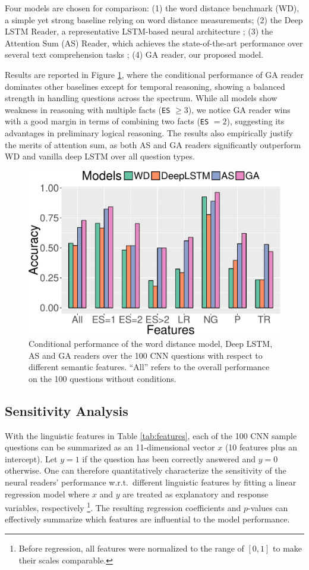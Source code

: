 \documentclass[11pt,a4paper]{article}
\begin{document}
Four models are chosen for comparison: (1) the word distance benchmark (WD), a simple yet strong baseline relying on word distance measurements; (2) the Deep LSTM Reader, a representative LSTM-based neural architecture
\citep{hermann2015teaching}; (3) the Attention Sum (AS) Reader, which achieves the state-of-the-art performance over several text comprehension tasks \citep{kadlec2016text}; (4) GA reader, our proposed model.

Results are reported in Figure \ref{fig:cond-performance},
where the conditional performance of GA reader dominates other baselines except for temporal reasoning, showing a balanced strength in handling questions across the spectrum. While all models show weakness in reasoning with multiple facts (\texttt{ES} $\ge 3$), we notice GA reader wins with a good margin in terms of combining two facts (\texttt{ES} $=2$), suggesting its advantages in preliminary logical reasoning. The results also empirically justify the merits of attention sum, as both AS and GA readers significantly outperform WD and vanilla deep LSTM over all question types.

\begin{figure}[t]
\centering
\includegraphics[width=0.9\linewidth]{cond-performance.pdf}
\caption{Conditional performance of the word distance model, Deep LSTM, AS and GA readers over the 100 CNN questions with respect to different semantic features. ``All'' refers to the overall performance on the 100 questions without conditions.}
\label{fig:cond-performance}
\end{figure}

\subsection{Sensitivity Analysis}
With the linguistic features in Table \ref{tab:features}, each of the 100 CNN sample questions can be summarized as an 11-dimensional vector $x$ (10 features plus an intercept). Let $y = 1$ if the question has been correctly answered and $y=0$ otherwise. One can therefore quantitatively characterize the sensitivity of the neural readers' performance w.r.t.\ different linguistic features by fitting a linear regression model where $x$ and $y$ are treated as explanatory and response variables, respectively
\footnote{Before regression, all features were normalized to the range of $[0,1]$ to make their scales comparable.}.
The resulting regression coefficients and $p$-values can effectively summarize which features are influential to the model performance.
\end{document}
